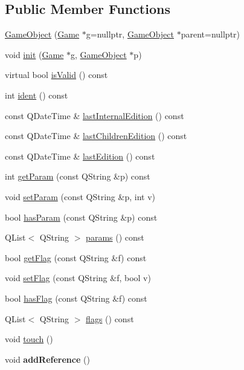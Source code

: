\subsection*{\-Public \-Member \-Functions}
\begin{DoxyCompactItemize}
\item 
\hyperlink{class_game_object_ab00c537faf6eb4439c60003141a763b9}{\-Game\-Object} (\hyperlink{class_game}{\-Game} $\ast$g=nullptr, \hyperlink{class_game_object}{\-Game\-Object} $\ast$parent=nullptr)
\item 
void \hyperlink{class_game_object_a97be7b59b2e76e7d60de2146b894eed9}{init} (\hyperlink{class_game}{\-Game} $\ast$g, \hyperlink{class_game_object}{\-Game\-Object} $\ast$p)
\item 
virtual bool \hyperlink{class_game_object_a88676a10f8e905747f1d64c2da490524}{is\-Valid} () const 
\item 
int \hyperlink{class_game_object_a4d84063c56c17bfdee8844eb3fa3445a}{ident} () const 
\item 
const \-Q\-Date\-Time \& \hyperlink{class_game_object_a0c4cc65819b30ec36a1c20a1c24997fe}{last\-Internal\-Edition} () const 
\item 
const \-Q\-Date\-Time \& \hyperlink{class_game_object_acc65ad08191fcaf558bd1840a45d23cf}{last\-Children\-Edition} () const 
\item 
const \-Q\-Date\-Time \& \hyperlink{class_game_object_a73b351287147712a937e87028bf8c876}{last\-Edition} () const 
\item 
int \hyperlink{class_game_object_a27de46b2b9b439755b1e57df51c35caf}{get\-Param} (const \-Q\-String \&p) const 
\item 
void \hyperlink{class_game_object_a28b8af7f399f1348a4f3130dd21173a1}{set\-Param} (const \-Q\-String \&p, int v)
\item 
bool \hyperlink{class_game_object_aa48c29e1ac9e9289f4647f8e263b9fae}{has\-Param} (const \-Q\-String \&p) const 
\item 
\-Q\-List$<$ \-Q\-String $>$ \hyperlink{class_game_object_a3e851f9aceb9e868a73dd58fe8e3719f}{params} () const 
\item 
bool \hyperlink{class_game_object_a30bc22a11619930d442bc16f0c938339}{get\-Flag} (const \-Q\-String \&f) const 
\item 
void \hyperlink{class_game_object_ae7984096fc518b15c0b080c543e4c42f}{set\-Flag} (const \-Q\-String \&f, bool v)
\item 
bool \hyperlink{class_game_object_a3c4f7121e75a8340a32e20f16b63b412}{has\-Flag} (const \-Q\-String \&f) const 
\item 
\-Q\-List$<$ \-Q\-String $>$ \hyperlink{class_game_object_aa9a0d6ea1bd41e4d4a370d2f010ac533}{flags} () const 
\item 
void \hyperlink{class_game_object_a2130d5674df041b5a7eaf987f9b1e642}{touch} ()
\item 
\hypertarget{class_game_object_a815c7f587c0ae528614add95655d9a0a}{void {\bfseries add\-Reference} ()}\label{class_game_object_a815c7f587c0ae528614add95655d9a0a}


\end{DoxyCompactItemize}

